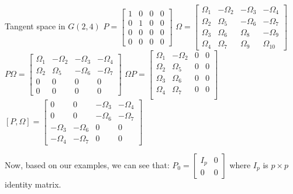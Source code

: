\documentclass[11pt,a4paper]{report}
\begin{document}
\begin{Ex}{Tangent space in $G(2,4)$}
    $P = \begin{bmatrix} 1 & 0 & 0 & 0 \\ 0 & 1 & 0 & 0 \\ 0 & 0 & 0 & 0 \\ 0 & 0 & 0 & 0 \end{bmatrix}$
    $\Omega = \begin{bmatrix} \Omega_1 & -\Omega_2 & -\Omega_3 & - \Omega_4 \\
                              \Omega_2 & \Omega_5 & - \Omega_6 & -\Omega_7 \\ 
                              \Omega_3 & \Omega_6 & \Omega_8 & - \Omega_9 \\ 
                              \Omega_4 & \Omega_7 & \Omega_9 & \Omega_{10}
                            \end{bmatrix}  $
    $P \Omega = \begin{bmatrix} \Omega_1 & -\Omega_2 & -\Omega_3 & -\Omega_4 \\
                            \Omega_2 & \Omega_5 & -\Omega_6 & -\Omega_7 \\
                            0 & 0 & 0 & 0 \\
                            0 & 0 & 0 & 0
                         \end{bmatrix} $
    $ \Omega P = \begin{bmatrix}
                \Omega_1 & -\Omega_2 & 0 & 0 \\
                \Omega_2 & \Omega_5 & 0 & 0 \\
                \Omega_3 & \Omega_6 & 0 & 0 \\
                \Omega_4 & \Omega_7 & 0 & 0 \\
                \end{bmatrix}$
    $ [P,\Omega] = \begin{bmatrix}
                0 & 0 & - \Omega_3 & -\Omega_4 \\
                0 & 0 & - \Omega_6 & - \Omega_7 \\
                - \Omega_3 & - \Omega_6 & 0 & 0 \\
                - \Omega_4 & - \Omega_7  & 0 & 0
    \end{bmatrix}
    $
\end{Ex}
Now, based on our examples, we can see that:
$ P_0 = \begin{bmatrix} I_p & 0 \\ 0 & 0 \end{bmatrix}$ where $I_p$ is $p \times p$ identity matrix.
\end{document}
